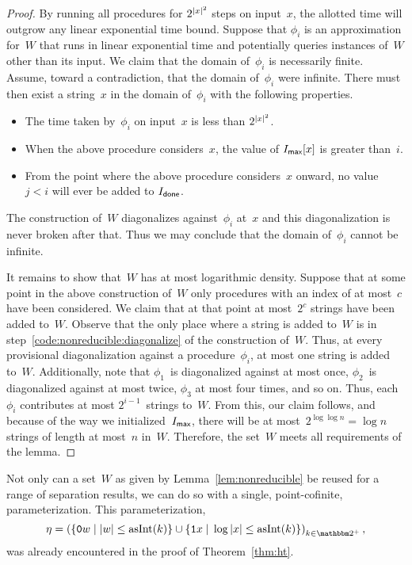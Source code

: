 \begin{proof}
  By running all procedures for $2^{{\lvert x\rvert}^2}$ steps on input~$x$, the allotted time will outgrow any linear exponential time bound.
  Suppose that $\phi_i$ is an approximation for~$W$ that runs in linear exponential time and potentially queries instances of~$W$ other than its input.
  We claim that the domain of~$\phi_i$ is necessarily finite.
  Assume, toward a contradiction, that the domain of~$\phi_i$ were infinite.
  There must then exist a string~$x$ in the domain of~$\phi_i$ with the following properties.
  \begin{itemize}
  \item
    The time taken by~$\phi_i$ on input~$x$ is less than $2^{{\lvert x\rvert}^2}$.
  \item
    When the above procedure considers~$x$, the value of $I_\textsf{max}[x]$ is greater than~$i$.
  \item
    From the point where the above procedure considers~$x$ onward, no value~$j < i$ will ever be added to $I_\textsf{done}$.
  \end{itemize}
  The construction of~$W$ diagonalizes against~$\phi_i$ at~$x$ and this diagonalization is never broken after that.
  Thus we may conclude that the domain of~$\phi_i$ cannot be infinite.

  It remains to show that~$W$ has at most logarithmic density.
  Suppose that at some point in the above construction of~$W$ only procedures with an index of at most~$c$ have been considered.
  We claim that at that point at most~$2^c$ strings have been added to~$W$.
  Observe that the only place where a string is added to~$W$ is in step~\ref{code:nonreducible:diagonalize} of the construction of~$W$.
  Thus, at every provisional diagonalization against a procedure~$\phi_i$, at most one string is added to~$W$.
  Additionally, note that $\phi_1$~is diagonalized against at most once, $\phi_2$~is diagonalized against at most twice, $\phi_3$ at most four times, and so on.
  Thus, each~$\phi_i$ contributes at most $2^{i - 1}$~strings to~$W$.
  From this, our claim follows, and because of the way we initialized~$I_\textsf{max}$, there will be at most~$2^{\log \log n} = \log n$ strings of length at most~$n$ in~$W$.
  Therefore, the set~$W$ meets all requirements of the lemma.
\end{proof}

Not only can a set~$W$ as given by Lemma~\ref{lem:nonreducible} be reused for a range of separation results, we can do so with a single, point-cofinite, parameterization.
This parameterization,
\begin{equation}
\label{eq:separation-parameterization}
  \eta \deq \left(\{\bits{0}w \st \length{w} \le \asNat(k)\} \cup \{\bits{1}x \st \log\length{x} \le \asNat(k)\}\right)_{k \in \binary^+},
\end{equation}
was already encountered in the proof of Theorem~\ref{thm:ht}.

